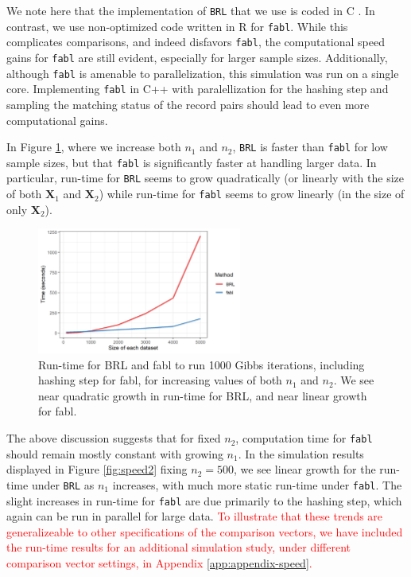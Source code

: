 \documentclass[ba]{imsart}
\begin{document}
	We note here that the implementation of \texttt{BRL} that we use is coded in C \citep{sadinle_bayesian_2017}.  In contrast, we use non-optimized code written in R for \texttt{fabl}.  While this complicates comparisons, and indeed disfavors \texttt{fabl}, the computational speed gains for \texttt{fabl} are still evident, especially for larger sample sizes.  Additionally, although \texttt{fabl} is amenable to parallelization, this simulation was run on a single core. Implementing \texttt{fabl} in C++ with paralellization for the hashing step and sampling the matching status of the record pairs should lead to even more computational gains.
	
	In Figure \ref{fig:speed1}, where we increase both $n_1$ and $n_2$, \texttt{BRL} is faster than \texttt{fabl} for low sample sizes, but that \texttt{fabl} is significantly faster at handling larger data. In particular, run-time for \texttt{BRL} seems to grow quadratically (or linearly with the size of both $\bm{X}_1$ and $\bm{X}_2$) while run-time for \texttt{fabl} seems to grow linearly (in the size of only $\bm{X}_2$).
	
	\begin{figure}[t]
		\begin{center} \includegraphics[width=0.6\textwidth]{../notes/figures/sadinle_speed_plot2} 
			\caption{Run-time for BRL and fabl to run 1000 Gibbs iterations, including hashing step for fabl, for increasing values of both $n_1$ and $n_2$. We see near quadratic growth in run-time for BRL, and near linear growth for fabl.}\label{fig:speed1}
		\end{center}
	\end{figure}
	
	The above discussion suggests that for fixed \(n_2\), computation time for \texttt{fabl} should remain mostly constant with growing \(n_1\). In the simulation results displayed in Figure \ref{fig:speed2} fixing \(n_2 = 500\), we see linear growth for the run-time under \texttt{BRL} as \(n_1\) increases, with much more static run-time under \texttt{fabl}. The slight increases in run-time for \texttt{fabl} are due primarily to the hashing step, which again can be run in parallel for large data. \textcolor{red}{To illustrate that these trends are generalizeable to other specifications of the comparison vectors, we have included the run-time results for an additional simulation study, under different comparison vector settings, in Appendix \ref{app:appendix-speed}.}
	
\end{document}
